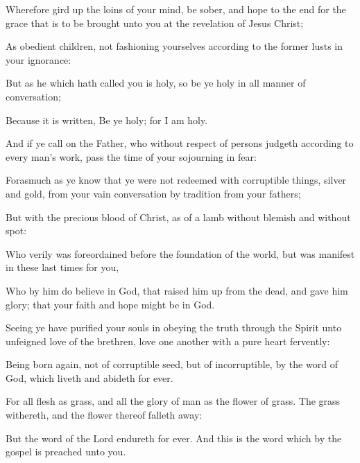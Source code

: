 {Wherefore gird
up the
loins of
your
mind, be
sober, and
hope to the
end
for the
grace that is to be
brought unto
you
at the
revelation of
Jesus
Christ;

As
obedient
children,
not fashioning yourselves according
to the
former
lusts
in
your
ignorance:

But
as he which hath
called
you is
holy,
so
be
ye
holy
in
all manner of
conversation;

Because it is
written, Be
ye
holy;
for
I
am
holy.

And
if ye call
on the
Father,
who without respect of
persons
judgeth according
to every
man’s
work,
pass the
time of
your
sojourning
{}
in
fear:

Forasmuch as ye
know
that ye
were
not
redeemed with corruptible
things,
{}
silver
and
gold,
from
your
vain
conversation
{} by tradition from your
fathers;

But with the
precious
blood of
Christ,
as of a
lamb without
blemish
and without
spot:

Who
verily was
foreordained
before the
foundation of the
world,
but was
manifest
in these
last
times
for
you,

Who
by
him do
believe
in
God,
that
raised
him
up
from the
dead,
and
gave
him
glory;
that
your
faith
and
hope might
be
in
God.

Seeing ye have
purified
your
souls
in
obeying the
truth
through the
Spirit
unto
unfeigned love of the
brethren,
{}
love one
another
with a
pure
heart
fervently:

Being born
again,
not
of
corruptible
seed,
but of
incorruptible,
by the
word of
God, which
liveth
and
abideth
for
ever.

For
all
flesh
{}
as
grass,
and
all the
glory of
man
as the
flower of
grass. The
grass
withereth,
and the
flower
thereof falleth
away:

But the
word of the
Lord
endureth
for
ever.
And
this
is the
word
which by the gospel is
preached
unto
you.




\par }
